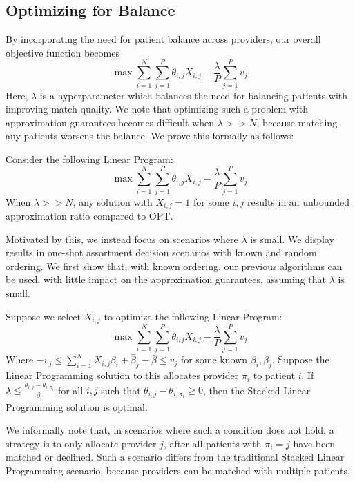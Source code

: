 \subsection{Optimizing for Balance}
By incorporating the need for patient balance across providers, our overall objective function becomes
\begin{equation}
    \max  \sum_{i=1}^{N} \sum_{j=1}^{P} \theta_{i,j} X_{i,j} - \frac{\lambda}{P} \sum_{j=1}^{P} v_{j}
\end{equation}
Here, $\lambda$ is a hyperparameter which balances the need for balancing patients with improving match quality. 
We note that optimizing such a problem with approximation guarantees becomes difficult when $\lambda >> N$, because matching any patients worsens the balance. 
We prove this formally as follows: 
\begin{lemma}
Consider the following Linear Program: 
\begin{equation}
    \max \sum_{i=1}^{N} \sum_{j=1}^{P} \theta_{i,j} X_{i,j} - \frac{\lambda}{P} \sum_{j=1}^{P} v_{j}
\end{equation}
When $\lambda >> N$, any solution with $X_{i,j} = 1$ for some $i,j$ results in an unbounded approximation ratio compared to $\mathrm{OPT}$. 
\end{lemma}

Motivated by this, we instead focus on scenarios where $\lambda$ is small. 
We display results in one-shot assortment decision scenarios with known and random ordering. 
We first show that, with known ordering, our previous algorithms can be used, with little impact on the approximation guarantees, assuming that $\lambda$ is small. 
\begin{lemma}
Suppose we select $X_{i,j}$ to optimize the following Linear Program: 
\begin{equation}
    \max \sum_{i=1}^{N} \sum_{j=1}^{P} \theta_{i,j} X_{i,j} - \frac{\lambda}{P} \sum_{j=1}^{P} v_{j}
\end{equation}
Where $-v_{j} \leq \sum_{i=1}^{N} X_{i,j} \beta_{i} + \hat{\beta}_{j} - \bar{\beta}\leq v_{j}$ for some known $\beta_{i}, \hat{\beta}_{j}$. 
Suppose the Linear Programming solution to this allocates provider $\pi_{i}$ to patient $i$. 
If $\lambda \leq \frac{\theta_{i,j}-\theta_{i,\pi_{i}}}{\beta_{i}}$ for all $i,j$ such that $\theta_{i,j}-\theta_{i,\pi_{i}} \geq 0$, then the Stacked Linear Programming solution is optimal. 
\end{lemma}
We informally note that, in scenarios where such a condition does not hold, a strategy is to only allocate provider $j$, after all patients with $\pi_{i}=j$ have been matched or declined. 
Such a scenario differs from the traditional Stacked Linear Programming scenario, because providers can be matched with multiple patients. 

